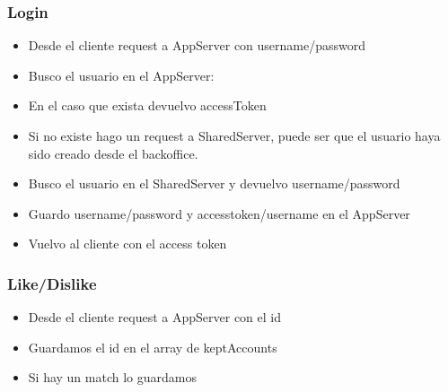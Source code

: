 \documentclass[letterpaper,10pt,english]{sphinxmanual}
\begin{document}
\subsubsection{Login}
\label{manuals:login}\begin{itemize}
\item {} 
Desde el cliente request a AppServer con username/password

\item {} 
Busco el usuario en el AppServer:

\item {} 
En el caso que exista devuelvo accessToken

\item {} 
Si no existe hago un request a SharedServer, puede ser que el usuario haya sido creado desde el backoffice.

\item {} 
Busco el usuario en el SharedServer y devuelvo username/password

\item {} 
Guardo username/password y accesstoken/username en el AppServer

\item {} 
Vuelvo al cliente con el access token

\end{itemize}


\subsubsection{Like/Dislike}
\label{manuals:like-dislike}\begin{itemize}
\item {} 
Desde el cliente request a AppServer con el id

\item {} 
Guardamos el id en el array de keptAccounts

\item {} 
Si hay un match lo guardamos

\end{itemize}
\end{document}
